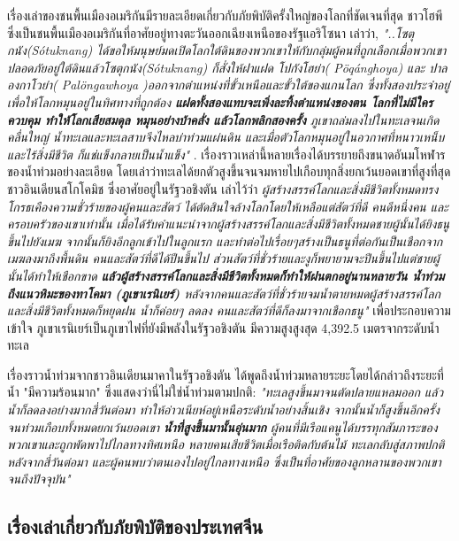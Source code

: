 \documentclass[10pt,twocolumn,letterpaper]{article}
\begin{document}
เรื่องเล่าของชนพื้นเมืองอเมริกันมีรายละเอียดเกี่ยวกับภัยพิบัติครั้งใหญ่ของโลกที่ชัดเจนที่สุด ชาวโฮพี ซึ่งเป็นชนพื้นเมืองอเมริกันที่อาศัยอยู่ทางตะวันออกเฉียงเหนือของรัฐแอริโซนา เล่าว่า, \textit{"..โซตุกนัง(Sótuknang) ได้ขอให้มนุษย์มดเปิดโลกใต้ดินของพวกเขาให้กับกลุ่มผู้คนที่ถูกเลือกเมื่อพวกเขาปลอดภัยอยู่ใต้ดินแล้วโซตุกนัง(Sótuknang) ก็สั่งให้ฝาแฝด โปกังโฮย่า( Pöqánghoya) และ
ปาลองกาโวย่า( Palöngawhoya )ออกจากตำแหน่งที่ขั้วเหนือและขั้วใต้ของแกนโลก ซึ่งทั้งสองประจำอยู่เพื่อให้โลกหมุนอยู่ในทิศทางที่ถูกต้อง \textbf{แฝดทั้งสองแทบจะเพิ่งละทิ้งตำแหน่งของตน โลกที่ไม่มีใครควบคุม ทำให้โลกเสียสมดุล หมุนอย่างบ้าคลั่ง แล้วโลกพลิกสองครั้ง} ภูเขาถล่มลงไปในทะเลจนเกิดคลื่นใหญ่ น้ำทะเลและทะเลสาบจึงไหลบ่าท่วมแผ่นดิน และเมื่อตัวโลกหมุนอยู่ในอวกาศที่หนาวเหน็บและไร้สิ่งมีชีวิต ก็แช่แข็งกลายเป็นน้ำแข็ง"} \cite{4}.
เรื่องราวเหล่านี้หลายเรื่องได้บรรยายถึงขนาดอันมโหฬารของน้ำท่วมอย่างละเอียด โดยเล่าว่าทะเลได้ยกตัวสูงขึ้นจนจมหายไปเกือบทุกสิ่งยกเว้นยอดเขาที่สูงที่สุด ชาวอินเดียนสโกโคมิช ซึ่งอาศัยอยู่ในรัฐวอชิงตัน เล่าไว้ว่า \textit{ผู้สร้างสรรค์โลกและสิ่งมีชีวิตทั้งหมดทรงโกรธเคืองความชั่วร้ายของผู้คนและสัตว์ ได้ตัดสินใจล้างโลกโดยให้เหลือแต่สัตว์ที่ดี คนดีหนึ่งคน และครอบครัวของเขาเท่านั้น เมื่อได้รับคำแนะนำจากผู้สร้างสรรค์โลกและสิ่งมีชีวิตทั้งหมดชายผู้นั้นได้ยิงธนูขึ้นไปยังเมฆ จากนั้นก็ยิงอีกลูกเข้าไปในลูกแรก และทำต่อไปเรื่อยๆสร้างเป็นธนูที่ต่อกันเป็นเชือกจากเมฆลงมาถึงพื้นดิน คนและสัตว์ที่ดีได้ปีนขึ้นไป ส่วนสัตว์ที่ชั่วร้ายและงูก็พยายามจะปีนขึ้นไปแต่ชายผู้นั้นได้ทำให้เชือกขาด \textbf{แล้วผู้สร้างสรรค์โลกและสิ่งมีชีวิตทั้งหมดก็ทำให้ฝนตกอยู่นานหลายวัน น้ำท่วมถึงแนวหิมะของทาโคมา (ภูเขาเรนิเยร์)} หลังจากคนและสัตว์ที่ชั่วร้ายจมน้ำตายหมดผู้สร้างสรรค์โลกและสิ่งมีชีวิตทั้งหมดก็หยุดฝน น้ำก็ค่อยๆ ลดลง คนและสัตว์ที่ดีก็ลงมาจากเชือกธนู"} \cite{3} เพื่อประกอบความเข้าใจ ภูเขาเรนิเยร์เป็นภูเขาไฟที่ยังมีพลังในรัฐวอชิงตัน มีความสูงสูงสุด 4,392.5 เมตรจากระดับน้ำทะเล

เรื่องราวน้ำท่วมจากชาวอินเดียนมาคาในรัฐวอชิงตัน ได้พูดถึงน้ำท่วมหลายระยะโดยได้กล่าวถึงระยะที่น้ำ "มีความร้อนมาก" ซึ่งแสดงว่านี่ไม่ใช่น้ำท่วมตามปกติ: \textit{"ทะเลสูงขึ้นมาจนตัดปลายแหลมออก แล้วน้ำก็ลดลงอย่างมากสี่วันต่อมา ทำให้อ่าวเนียห์อยู่เหนือระดับน้ำอย่างสิ้นเชิง จากนั้นน้ำก็สูงขึ้นอีกครั้งจนท่วมเกือบทั้งหมดยกเว้นยอดเขา \textbf{น้ำที่สูงขึ้นมานั้นอุ่นมาก} ผู้คนที่มีเรือแคนูได้บรรทุกสัมภาระของพวกเขาและถูกพัดพาไปไกลทางทิศเหนือ หลายคนเสียชีวิตเมื่อเรือติดกับต้นไม้ ทะเลกลับสู่สภาพปกติหลังจากสี่วันต่อมา และผู้คนพบว่าตนเองไปอยู่ไกลทางเหนือ ซึ่งเป็นที่อาศัยของลูกหลานของพวกเขาจนถึงปัจจุบัน"} \cite{3}

\subsection{เรื่องเล่าเกี่ยวกับภัยพิบัติของประเทศจีน}
\end{document}
